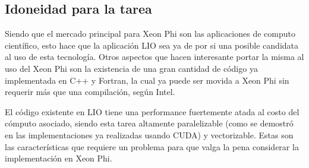 \subsection{Idoneidad para la tarea}

Siendo que el mercado principal para Xeon Phi son las aplicaciones de computo cient\'ifico, esto hace que la
aplicaci\'on LIO sea ya de por si una posible candidata al uso de esta tecnolog\'ia. Otros aspectos que
hacen interesante portar la misma al uso del Xeon Phi son la existencia de una gran cantidad de c\'odigo ya
implementada en C++ y Fortran, la cual ya puede ser movida a Xeon Phi sin requerir m\'as que una compilaci\'on,
seg\'un Intel.

El c\'odigo existente en LIO tiene una performance fuertemente atada al costo del c\'omputo asociado,
siendo esta tarea altamente paralelizable (como se demostr\'o en las implementaciones ya realizadas usando CUDA) y
vectorizable. Estas son las caracter\'isticas que requiere un problema para que valga la pena considerar la
implementaci\'on en Xeon Phi.
